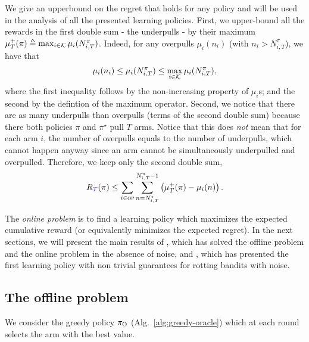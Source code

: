 We give an upperbound on the regret that holds for any policy and will be used in the analysis of all the presented learning policies. First, we upper-bound all the rewards in the first double sum - the underpulls - by their maximum $\mu^+_T(\pi) \triangleq \max_{i\in\mathcal{K}} \mu_i(N_{i,T}^\pi)$. Indeed, for any overpulls $\mu_i(n_i) $ (with  $n_i > N_{i,T}^\pi$), we have that
\[
\mu_i(n_i) \leq \mu_i(N_{i,T}^\pi) \leq \max_{i\in\mathcal{K}} \mu_i(N_{i,T}^\pi),
\]
where the first inequality follows by the non-increasing property of $\mu_i$s; and the second by the defintion of the maximum operator. Second, we notice that there are as many underpulls than overpulls (terms of the second double sum) because there both policies $ \pi$ and $\pi^\star$ pull $T$ arms. Notice that this does \emph{not} mean that for each arm $i$, the number of overpulls equals to the number of underpulls, which cannot happen anyway since an arm cannot be simultaneously underpulled and overpulled. Therefore, we keep only the second double sum,
\begin{equation}
\label{eq:regret-first-bound}
\regret(\pi) \leq \sum_{i\in \overpullSet}   \sum_{n=N_{i,T}^\star}^{N_{i,T}^\pi-1} \pa{\mu^+_T(\pi) - \mu_i(n)}.
\end{equation}

The \textit{online problem} is to find a learning policy which maximizes the expected cumulative reward (or equivalently minimizes the expected regret). In the next sections, we will present the main results of \citet{heidari2016tight}, which has solved the offline problem and the online problem in the absence of noise, and \citet{levine2017rotting}, which has presented the first learning policy with non trivial guarantees for rotting bandits with noise. 

\subsection{The offline problem \citep{heidari2016tight}}
We consider the greedy policy $\pi_{\rm O}$ (Alg.~\ref{alg:greedy-oracle}) which at each round selects the arm with the best value.

